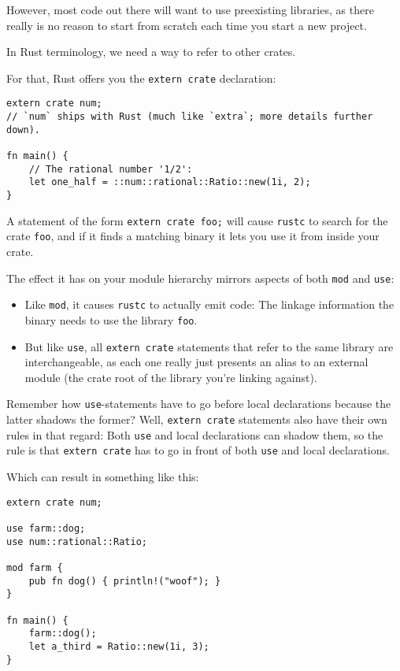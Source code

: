 \documentclass[]{article}
\begin{document}
However, most code out there will want to use preexisting libraries, as
there really is no reason to start from scratch each time you start a
new project.

In Rust terminology, we need a way to refer to other crates.

For that, Rust offers you the \texttt{extern crate} declaration:

\begin{verbatim}
extern crate num;
// `num` ships with Rust (much like `extra`; more details further down).

fn main() {
    // The rational number '1/2':
    let one_half = ::num::rational::Ratio::new(1i, 2);
}
\end{verbatim}

A statement of the form \texttt{extern crate foo;} will cause
\texttt{rustc} to search for the crate \texttt{foo}, and if it finds a
matching binary it lets you use it from inside your crate.

The effect it has on your module hierarchy mirrors aspects of both
\texttt{mod} and \texttt{use}:

\begin{itemize}
\item
  Like \texttt{mod}, it causes \texttt{rustc} to actually emit code: The
  linkage information the binary needs to use the library \texttt{foo}.
\item
  But like \texttt{use}, all \texttt{extern crate} statements that refer
  to the same library are interchangeable, as each one really just
  presents an alias to an external module (the crate root of the library
  you're linking against).
\end{itemize}

Remember how \texttt{use}-statements have to go before local
declarations because the latter shadows the former? Well,
\texttt{extern crate} statements also have their own rules in that
regard: Both \texttt{use} and local declarations can shadow them, so the
rule is that \texttt{extern crate} has to go in front of both
\texttt{use} and local declarations.

Which can result in something like this:

\begin{verbatim}
extern crate num;

use farm::dog;
use num::rational::Ratio;

mod farm {
    pub fn dog() { println!("woof"); }
}

fn main() {
    farm::dog();
    let a_third = Ratio::new(1i, 3);
}
\end{verbatim}
\end{document}
